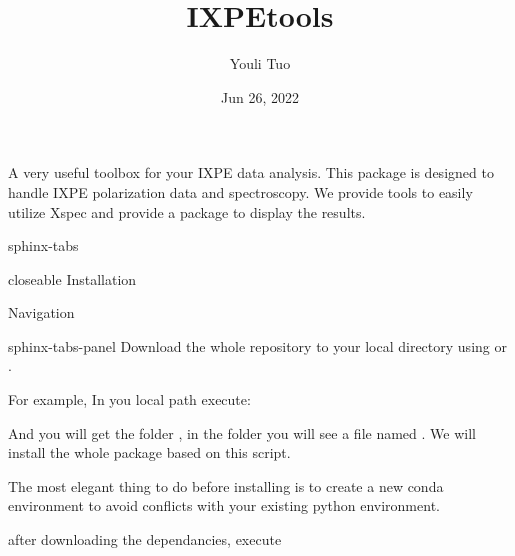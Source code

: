 \documentclass[letterpaper,10pt,english]{sphinxmanual}
\title{IXPE\sphinxhyphen{}tools}
\date{Jun 26, 2022}
\author{Youli Tuo}
\begin{document}
\pagestyle{empty}
\sphinxmaketitle
\pagestyle{plain}
\sphinxtableofcontents
\pagestyle{normal}
\label{\detokenize{index::doc}}


\sphinxAtStartPar
A very useful toolbox for your IXPE data analysis.
This package is designed to handle IXPE polarization data and spectroscopy.
We provide tools to easily utilize Xspec and provide a package to display the results.

\begin{sphinxuseclass}{sphinx-tabs}
\begin{sphinxuseclass}{closeable}
\sphinxAtStartPar
Installation

\sphinxAtStartPar
Navigation

\end{sphinxuseclass}
\begin{sphinxuseclass}{sphinx-tabs-panel}
\sphinxAtStartPar
Download the whole repository to your local directory using  or .

\sphinxAtStartPar
For example, In you local path execute:

\begin{sphinxVerbatim}[commandchars=\\\{\}]
\end{sphinxVerbatim}

\sphinxAtStartPar
And you will get the folder , in the folder you will see a file named . We will install the whole package based on this script.

\sphinxAtStartPar
The most elegant thing to do before installing is to create a new conda environment to avoid conflicts with your existing python environment.

\begin{sphinxVerbatim}[commandchars=\\\{\}]
\end{sphinxVerbatim}

\sphinxAtStartPar
after downloading the dependancies, execute

\begin{sphinxVerbatim}[commandchars=\\\{\}]
\end{sphinxVerbatim}


\end{sphinxuseclass}
\end{sphinxuseclass}
\end{document}
